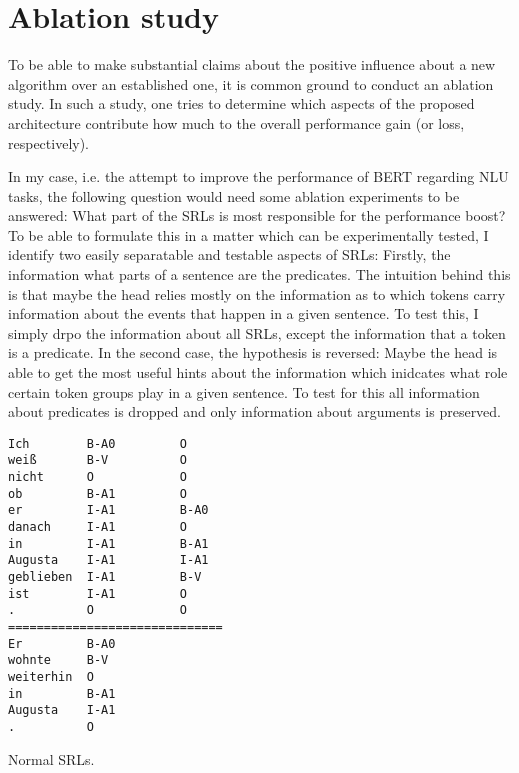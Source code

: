 \section{Ablation study}
\label{sec:ablation}

To be able to make substantial claims about the positive influence about a new algorithm over an
established one, it is common ground to conduct an ablation study. In such a study, one tries to
determine which aspects of the proposed architecture contribute how much to the overall performance
gain (or loss, respectively).

In my case, i.e. the attempt to improve the performance of BERT regarding NLU tasks, the
following question would need some ablation experiments to be answered: What part of the
SRLs is most responsible for the performance boost? To be able to formulate this in a
matter which can be experimentally tested, I identify two easily separatable and testable
aspects of SRLs: Firstly, the information what parts of a sentence are the predicates.
The intuition behind this is that maybe the head relies mostly on the information as to
which tokens carry information about the events that happen in a given sentence. To test
this, I simply drpo the information about all SRLs, except the information that a token
is a predicate. In the second case, the hypothesis is reversed: Maybe the head is able to
get the most useful hints about the information which inidcates what role certain token
groups play in a given sentence. To test for this all information about predicates is
dropped and only information about arguments is preserved.

\begin{minipage}{1.0\linewidth}
\begin{srl}
\centering
\begin{BVerbatim}[commandchars=\\\{\}, fontsize=\footnotesize]
Ich        B-A0         O
weiß       B-V          O
nicht      O            O
ob         B-A1         O
er         I-A1         B-A0
danach     I-A1         O
in         I-A1         B-A1
Augusta    I-A1         I-A1
geblieben  I-A1         B-V
ist        I-A1         O
.          O            O
==============================
Er         B-A0
wohnte     B-V
weiterhin  O
in         B-A1
Augusta    I-A1
.          O
\end{BVerbatim}
  \caption{Normal SRLs.}
\end{srl}
\end{minipage}


